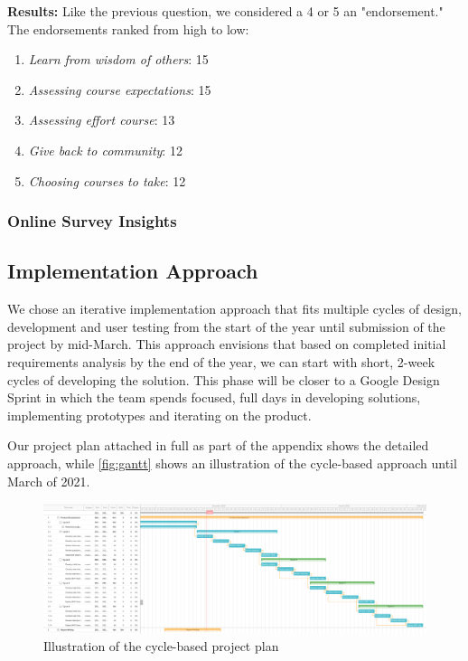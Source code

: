 \textbf{Results:} Like the previous question, we considered a 4 or 5 an "endorsement." The endorsements ranked from high to low:
\begin{enumerate}
    \item \textit{Learn from wisdom of others}: 15
    \item \textit{Assessing course expectations}: 15
    \item \textit{Assessing effort course}: 13
    \item \textit{Give back to community}: 12
    \item \textit{Choosing courses to take}: 12
\end{enumerate}
\smallskip

\subsubsection{Online Survey Insights}

\subsection{Implementation Approach}

We chose an iterative implementation approach that fits multiple cycles of design, development and user testing from the start of the year until submission of the project by mid-March. This approach envisions that based on completed initial requirements analysis by the end of the year, we can start with short, 2-week cycles of developing the solution. This phase will be closer to a Google Design Sprint in which the team spends focused, full days in developing solutions, implementing prototypes and iterating on the product.

Our project plan attached in full as part of the appendix shows the detailed approach, while \autoref{fig:gantt} shows an illustration of the cycle-based approach until March of 2021.

\begin{figure}[H]
    \centering
\includegraphics[width=\textwidth]{images/gantt.png}
    \caption{Illustration of the cycle-based project plan}
    \label{fig:gantt}
\end{figure}

